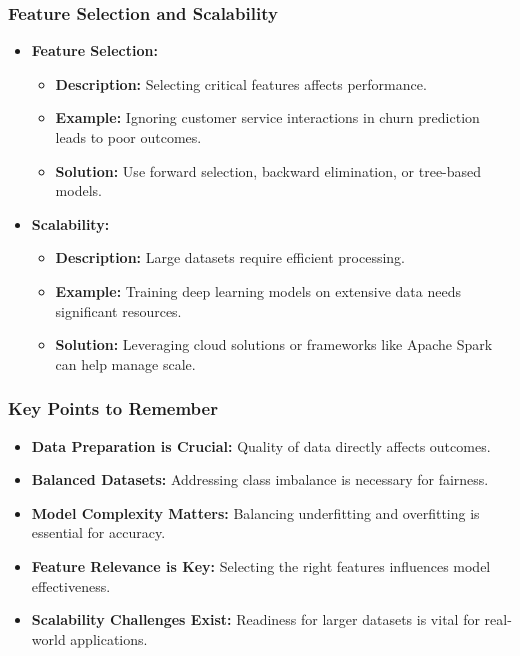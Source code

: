 \documentclass[aspectratio=169]{beamer}
\begin{document}
\begin{frame}[fragile]
    \frametitle{Feature Selection and Scalability}
    \begin{itemize}
        \item \textbf{Feature Selection:}
            \begin{itemize}
                \item \textbf{Description:} Selecting critical features affects performance.
                \item \textbf{Example:} Ignoring customer service interactions in churn prediction leads to poor outcomes.
                \item \textbf{Solution:} Use forward selection, backward elimination, or tree-based models.
            \end{itemize}
            
        \item \textbf{Scalability:}
            \begin{itemize}
                \item \textbf{Description:} Large datasets require efficient processing.
                \item \textbf{Example:} Training deep learning models on extensive data needs significant resources.
                \item \textbf{Solution:} Leveraging cloud solutions or frameworks like Apache Spark can help manage scale.
            \end{itemize}
    \end{itemize}
\end{frame}

\begin{frame}[fragile]
    \frametitle{Key Points to Remember}
    \begin{itemize}
        \item \textbf{Data Preparation is Crucial:} Quality of data directly affects outcomes.
        \item \textbf{Balanced Datasets:} Addressing class imbalance is necessary for fairness.
        \item \textbf{Model Complexity Matters:} Balancing underfitting and overfitting is essential for accuracy.
        \item \textbf{Feature Relevance is Key:} Selecting the right features influences model effectiveness.
        \item \textbf{Scalability Challenges Exist:} Readiness for larger datasets is vital for real-world applications.
    \end{itemize}
\end{frame}
\end{document}

